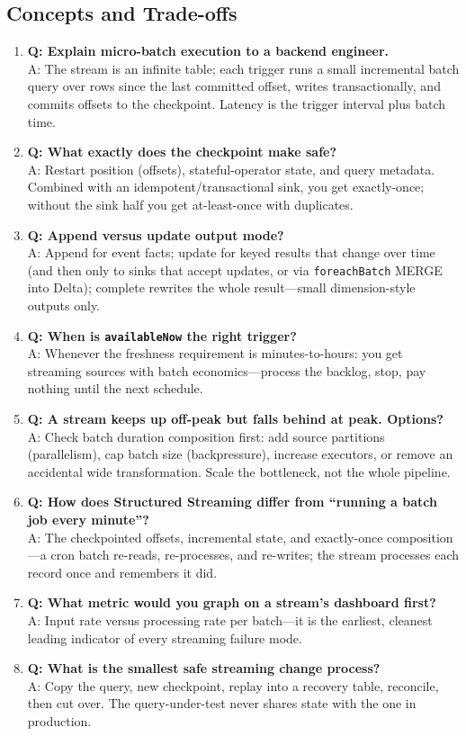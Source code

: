 \subsection{Concepts and Trade-offs}
\begin{enumerate}
    \item \textbf{Q: Explain micro-batch execution to a backend engineer.}\\
    A: The stream is an infinite table; each trigger runs a small incremental batch query over rows since the last committed offset, writes transactionally, and commits offsets to the checkpoint. Latency is the trigger interval plus batch time.
    \item \textbf{Q: What exactly does the checkpoint make safe?}\\
    A: Restart position (offsets), stateful-operator state, and query metadata. Combined with an idempotent/transactional sink, you get exactly-once; without the sink half you get at-least-once with duplicates.
    \item \textbf{Q: Append versus update output mode?}\\
    A: Append for event facts; update for keyed results that change over time (and then only to sinks that accept updates, or via \texttt{foreachBatch} MERGE into Delta); complete rewrites the whole result---small dimension-style outputs only.
    \item \textbf{Q: When is \texttt{availableNow} the right trigger?}\\
    A: Whenever the freshness requirement is minutes-to-hours: you get streaming sources with batch economics---process the backlog, stop, pay nothing until the next schedule.
    \item \textbf{Q: A stream keeps up off-peak but falls behind at peak. Options?}\\
    A: Check batch duration composition first: add source partitions (parallelism), cap batch size (backpressure), increase executors, or remove an accidental wide transformation. Scale the bottleneck, not the whole pipeline.
    \item \textbf{Q: How does Structured Streaming differ from ``running a batch job every minute''?}\\
    A: The checkpointed offsets, incremental state, and exactly-once composition---a cron batch re-reads, re-processes, and re-writes; the stream processes each record once and remembers it did.
    \item \textbf{Q: What metric would you graph on a stream's dashboard first?}\\
    A: Input rate versus processing rate per batch---it is the earliest, cleanest leading indicator of every streaming failure mode.
    \item \textbf{Q: What is the smallest safe streaming change process?}\\
    A: Copy the query, new checkpoint, replay into a recovery table, reconcile, then cut over. The query-under-test never shares state with the one in production.
\end{enumerate}


